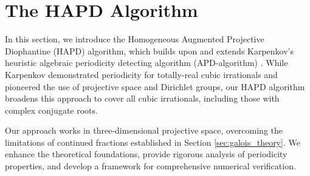 \section{The HAPD Algorithm}\label{sec:hapd_algorithm}

In this section, we introduce the Homogeneous Augmented Projective Diophantine (HAPD) algorithm, which builds upon and extends Karpenkov's heuristic algebraic periodicity detecting algorithm (APD-algorithm) \cite{Karpenkov2022}. While Karpenkov demonstrated periodicity for totally-real cubic irrationals and pioneered the use of projective space and Dirichlet groups, our HAPD algorithm broadens this approach to cover all cubic irrationals, including those with complex conjugate roots.

Our approach works in three-dimensional projective space, 
overcoming the limitations of continued fractions established 
in Section \ref{sec:galois_theory}. We enhance the theoretical 
foundations, provide rigorous analysis of periodicity properties, 
and develop a framework for comprehensive numerical verification.

